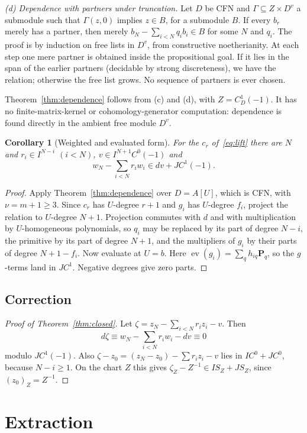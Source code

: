 \documentclass[11pt]{amsart}
\numberwithin{equation}{section}
\newtheorem{corollary}[theorem]{Corollary}
\theoremstyle{definition}
\theoremstyle{remark}
\DeclareMathOperator{\ev}{ev}
\begin{document}
\emph{(d) Dependence with partners under truncation.} Let $D$ be CFN
and $\Gamma\subseteq Z\times D^v$ a submodule such that $\Gamma(z,0)$
implies $z\in B$, for a submodule $B$. If every $b_r$ merely has a
partner, then merely $b_N-\sum_{i<N}q_ib_i\in B$ for some $N$ and $q_i$.
The proof is by induction on free lists in $D^v$, from constructive
noetherianity. At each step one mere partner is obtained inside the
propositional goal. If it lies in the span of the earlier partners
(decidable by strong discreteness), we have the relation; otherwise the
free list grows. No sequence of partners is ever chosen.

Theorem~\ref{thm:dependence} follows from (c) and (d), with
$Z=C^1_D(-1)$. It has no finite-matrix-kernel or cohomology-generator
computation: dependence is found directly in the ambient free module
$D^v$.

\begin{corollary}[Weighted and evaluated form]\label{cor:weighted}
For the $c_r$ of~\eqref{eq:lift} there are $N$ and
$r_i\in I^{N-i}$ $(i<N)$, $v\in I^{N+1}C^0(-1)$ and
\[
 w_N-\sum_{i<N}r_iw_i\in dv+JC^1(-1).
\]
\end{corollary}
\begin{proof}
Apply Theorem~\ref{thm:dependence} over $D=A[U]$, which is CFN, with
$\nu=m+1\ge3$. Since $c_r$ has $U$-degree $r+1$ and $g_i$ has $U$-degree
$f_i$, project the relation to $U$-degree $N+1$. Projection commutes
with $d$ and with multiplication by $U$-homogeneous polynomials, so
$q_i$ may be replaced by its part of degree $N-i$, the primitive by
its part of degree $N+1$, and the multipliers of $g_i$ by their parts of
degree $N+1-f_i$. Now evaluate at $U=b$. Here
$\ev(g_i)=\sum_qh_{iq}\mathbf P_q$, so the $g$-terms land in $JC^1$.
Negative degrees give zero parts.
\end{proof}

\subsection{Correction}
\begin{proof}[Proof of Theorem~\ref{thm:closed}]
Let $\zeta=z_N-\sum_{i<N}r_iz_i-v$. Then
\[
 d\zeta\equiv w_N-\sum_{i<N}r_iw_i-dv\equiv0
\]
modulo $JC^1(-1)$. Also $\zeta-z_0=(z_N-z_0)-\sum r_iz_i-v$ lies in
$IC^0+JC^0$, because $N-i\ge1$. On the chart $Z$ this gives
$\zeta_Z-Z^{-1}\in IS_Z+JS_Z$, since $(z_0)_Z=Z^{-1}$.
\end{proof}

\section{Extraction}\label{sec:extraction}
\end{document}
